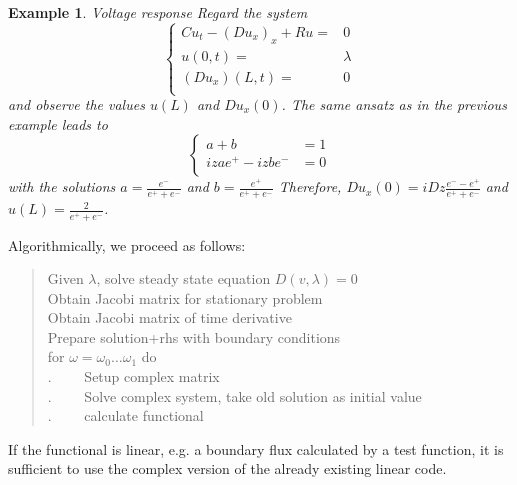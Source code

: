 \documentclass[10pt]{amsart}
\newtheorem{example}{Example}
\begin{document}
\begin{example}{Voltage response}
Regard the system
  \begin{equation*}
    \begin{cases}
      Cu_t - (Du_x)_x + Ru=&0\\
      u(0,t)=&\lambda\\
      (Du_x)(L,t)=&0\\
    \end{cases}
  \end{equation*}
  and observe the values $u(L)$ and $Du_x(0)$.
The same ansatz as in the previous example leads to 
\begin{equation*}
  \begin{cases}
    a+b&=1\\
    izae^+-izbe^-&=0\\
  \end{cases}
\end{equation*}
with the solutions $a=\frac{e^-}{e^++e^-}$ and $b=\frac{e^+}{e^++e^-}$
Therefore,  $Du_x(0)=iDz\frac{e^--e^+}{e^++e^-}$ and
$u(L)=\frac2{e^++e^-}$.
\end{example}




Algorithmically, we proceed as follows:
\begin{quotation}
\parindent0pt
Given $\lambda$, solve steady state equation $D(v,\lambda)=0$\\
Obtain Jacobi matrix for stationary problem \\%
Obtain Jacobi matrix of time derivative\\ %

Prepare solution+rhs with boundary conditions\\
for $\omega=\omega_0\dots\omega_1$ do\\
.~~~~ Setup complex matrix\\
.~~~~ Solve complex system, take old solution as initial value\\
.~~~~ calculate functional\\
\end{quotation}

If the functional is linear, e.g. a boundary flux calculated by a test function, it is sufficient to
use the complex version of the already existing linear code.
\end{document}
